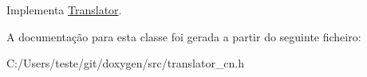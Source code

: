 Implementa \hyperlink{class_translator}{Translator}.



A documentação para esta classe foi gerada a partir do seguinte ficheiro\-:\begin{DoxyCompactItemize}
\item 
C\-:/\-Users/teste/git/doxygen/src/translator\-\_\-cn.\-h\end{DoxyCompactItemize}
